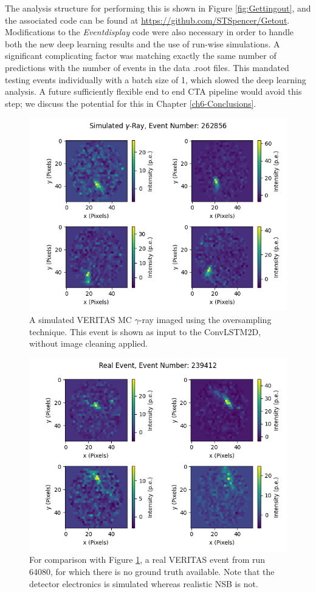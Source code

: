The analysis structure for performing this is shown in Figure \ref{fig:Gettingout}, and the associated code can be found at \url{https://github.com/STSpencer/Getout}. Modifications to the \textit{Eventdisplay} code were also necessary in order to handle both the new deep learning results and the use of run-wise simulations. A significant complicating factor was matching exactly the same number of predictions with the number of events in the data .root files. This mandated testing events individually with a batch size of 1, which slowed the deep learning analysis. A future sufficiently flexible end to end CTA pipeline would avoid this step; we discuss the potential for this in Chapter \ref{ch6-Conclusions}.
\begin{figure}[h] 
        \centering \includegraphics[width=0.8\columnwidth]{figures/sim_272_oversampling.png}

        \caption{
                \label{fig:sim} A simulated VERITAS MC $\gamma$-ray imaged using the oversampling technique. This event is shown as input to the ConvLSTM2D, without image cleaning applied.
        }
\end{figure}
\begin{figure}[h] 
        \centering \includegraphics[width=0.8\columnwidth]{figures/realevent_303_oversampling.png}

        \caption{
                \label{fig:real} For comparison with Figure \ref{fig:sim}, a real VERITAS event from run 64080, for which there is no ground truth available. Note that the detector electronics is simulated whereas realistic NSB is not.
        }
\end{figure}
